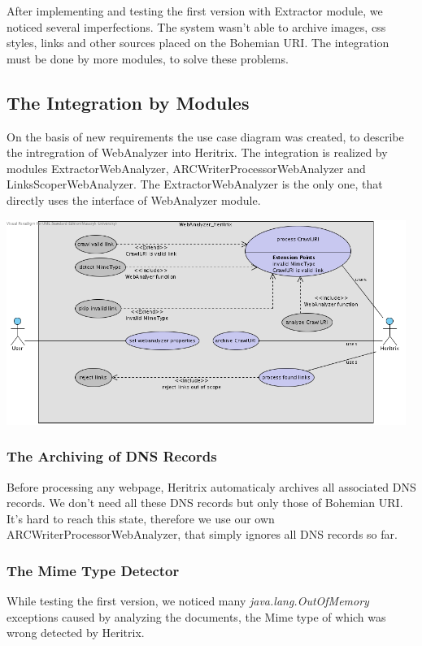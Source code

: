 \documentclass[11pt,a4paper]{article}
\begin{document}
After implementing and testing the first version with Extractor module, we noticed several imperfections. The system wasn't able to archive images, css styles, links and other sources placed on the Bohemian URI. The integration must be done by more modules, to solve these problems.

\subsection{The Integration by Modules}
On the basis of new requirements the use case diagram was created, to describe the intregration of WebAnalyzer into Heritrix. The integration is realized by modules ExtractorWebAnalyzer, ARCWriterProcessorWebAnalyzer and LinksScoperWebAnalyzer. The ExtractorWebAnalyzer is the only one, that directly uses the interface of WebAnalyzer module.

\begin{center}
\includegraphics[width=130mm]{usecase1.png}
\end{center}

\subsubsection{The Archiving of DNS Records}
Before processing any webpage, Heritrix automaticaly archives all asso\-cia\-ted DNS records. We don't need all these DNS records but only those of Bohemian URI. It's hard to reach this state, therefore we use our own ARCWriterProcessorWebAnalyzer, that simply ignores all DNS records so far.

\subsubsection{The Mime Type Detector}
While testing the first version, we noticed many \emph{java.lang.OutOfMemory} exceptions caused by analyzing the documents, the Mime type of which was wrong detected by Heritrix.
\end{document}
